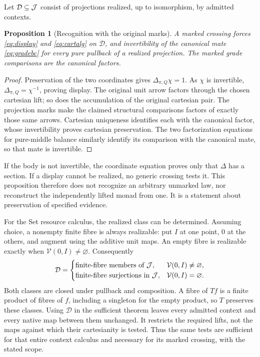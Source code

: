 \documentclass[11pt]{article}
\numberwithin{equation}{section}
\newtheorem{proposition}[theorem]{Proposition}
\theoremstyle{definition}\newtheorem{definition}[theorem]{Definition}
\newcommand{\V}{\mathcal V}\newcommand{\Set}{\mathsf{Set}}\newcommand{\Cat}{\mathsf{Cat}}
\begin{document}
Let $\mathcal D\subseteq\mathcal J$ consist of projections realized, up to
isomorphism, by admitted contexts.
\begin{proposition}[Recognition with the original marks]\label{prop:recognition}
A marked crossing forces \eqref{eq:display} and \eqref{eq:cartalg} on
$\mathcal D$, and invertibility of the canonical mate
\eqref{eq:gradebc} for every pure pullback of a realized projection.
The marked grade comparisons are the canonical factors.
\end{proposition}
\begin{proof}
Preservation of the two coordinates gives $\Delta_{\pi,Q}\chi=1$.
As $\chi$ is invertible, $\Delta_{\pi,Q}=\chi^{-1}$, proving display.
The original unit arrow factors through the chosen cartesian lift;
so does the accumulation of the original cartesian pair. The projection
marks make the claimed structural comparisons factors of exactly those
same arrows. Cartesian uniqueness identifies each with the canonical
factor, whose invertibility proves cartesian preservation. The two
factorization equations for pure-middle balance similarly identify its
comparison with the canonical mate, so that mate is invertible.
\end{proof}
If the body is not invertible, the coordinate equation proves only that
$\Delta$ has a section. If a display cannot be realized, no generic
crossing tests it. This proposition therefore does not recognize an
arbitrary unmarked law, nor reconstruct the independently lifted monad
from one. It is a statement about preservation of specified evidence.

For the Set resource calculus, the realized class can be determined.
Assuming choice, a nonempty finite fibre is always realizable: put $I$
at one point, $0$ at the others, and augment using the additive unit maps.
An empty fibre is realizable exactly when $\V(0,I)\ne\varnothing$.
Consequently
\begin{equation}\label{eq:realized}
 \mathcal D=
 \begin{cases}
 \text{finite-fibre members of }\J,&\V(0,I)\ne\varnothing,\\
 \text{finite-fibre surjections in }\J,&\V(0,I)=\varnothing.
 \end{cases}
\end{equation}
Both classes are closed under pullback and composition. A fibre of $Tf$
is a finite product of fibres of $f$, including a singleton for the empty
product, so $T$ preserves these classes. Using $\mathcal D$ in the
sufficient theorem leaves every admitted context and every native map
between them unchanged. It restricts the required lifts, not the maps
against which their cartesianity is tested. Thus the same tests are
sufficient for that entire context calculus and necessary for its marked
crossing, with the stated scope.
\end{document}
